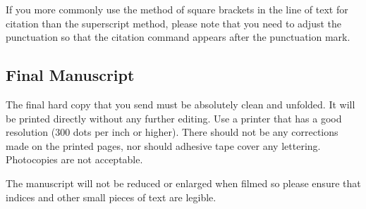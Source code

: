 \documentclass{ws-p8-50x6-00}
\begin{document}
If you more commonly use the method of square brackets in the line of text
for citation than the superscript method,
please note that you need  to adjust the punctuation
so that the citation command appears after the punctuation mark.

\subsection{Final Manuscript}
The final hard copy that you send must be absolutely clean and unfolded.
It will be printed directly without any further editing. Use a printer
that has a good resolution (300 dots per inch or higher). There should
not be any corrections made on the printed pages, nor should adhesive
tape cover any lettering. Photocopies are not acceptable.

The manuscript will not be reduced or enlarged when filmed so please ensure
that indices and other small pieces of text are legible.
\end{document}
